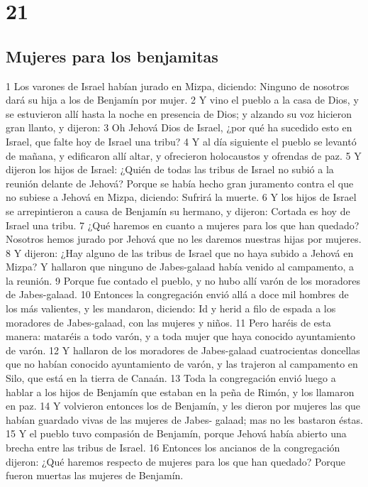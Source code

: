 \chapter{21}

\section*{Mujeres para los benjamitas}


1 Los varones de Israel habían jurado en Mizpa, diciendo: Ninguno de nosotros dará su hija a los de Benjamín por mujer.
2 Y vino el pueblo a la casa de Dios, y se estuvieron allí hasta la noche en presencia de Dios; y alzando su voz hicieron gran llanto, y dijeron:
3 Oh Jehová Dios de Israel, ¿por qué ha sucedido esto en Israel, que falte hoy de Israel una tribu?
4 Y al día siguiente el pueblo se levantó de mañana, y edificaron allí altar, y ofrecieron holocaustos y ofrendas de paz.
5 Y dijeron los hijos de Israel: ¿Quién de todas las tribus de Israel no subió a la reunión delante de Jehová? Porque se había hecho gran juramento contra el que no subiese a Jehová en Mizpa, diciendo: Sufrirá la muerte.
6 Y los hijos de Israel se arrepintieron a causa de Benjamín su hermano, y dijeron: Cortada es hoy de Israel una tribu.
7 ¿Qué haremos en cuanto a mujeres para los que han quedado? Nosotros hemos jurado por Jehová que no les daremos nuestras hijas por mujeres.
8 Y dijeron: ¿Hay alguno de las tribus de Israel que no haya subido a Jehová en Mizpa? Y hallaron que ninguno de Jabes-galaad había venido al campamento, a la reunión.
9 Porque fue contado el pueblo, y no hubo allí varón de los moradores de Jabes-galaad. 
10 Entonces la congregación envió allá a doce mil hombres de los más valientes, y les mandaron, diciendo: Id y herid a filo de espada a los moradores de Jabes-galaad, con las mujeres y niños.
11 Pero haréis de esta manera: mataréis a todo varón, y a toda mujer que haya conocido ayuntamiento de varón.
12 Y hallaron de los moradores de Jabes-galaad cuatrocientas doncellas que no habían conocido ayuntamiento de varón, y las trajeron al campamento en Silo, que está en la tierra de Canaán.
13 Toda la congregación envió luego a hablar a los hijos de Benjamín que estaban en la peña de Rimón, y los llamaron en paz.
14 Y volvieron entonces los de Benjamín, y les dieron por mujeres las que habían guardado vivas de las mujeres de Jabes- galaad; mas no les bastaron éstas.
15 Y el pueblo tuvo compasión de Benjamín, porque Jehová había abierto una brecha entre las tribus de Israel.
16 Entonces los ancianos de la congregación dijeron: ¿Qué haremos respecto de mujeres para los que han quedado? Porque fueron muertas las mujeres de Benjamín.
